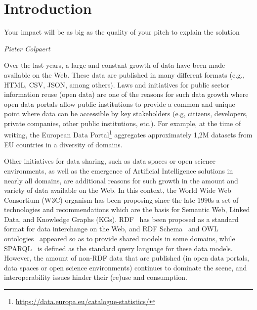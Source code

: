 \chapter{Introduction}
\label{chap:intro}

\epigraph{Your impact will be as big as the quality of your pitch to explain the solution}{\textit{Pieter Colpaert}}

Over the last years, a large and constant growth of data have been made available on the Web. These data are published in many different formats (e.g., HTML, CSV, JSON, among others). Laws and initiatives for public sector information reuse (open data) are one of the reasons for such data growth where open data portals allow public institutions to provide a common and unique point where data can be accessible by key stakeholders (e.g, citizens, developers, private companies, other public institutions, etc.). For example, at the time of writing, the European Data Portal\footnote{\url{https://data.europa.eu/catalogue-statistics/}} aggregates approximately 1,2M datasets from EU countries in a diversity of domains. 

Other initiatives for data sharing, such as data spaces or open science environments, as well as the emergence of Artificial Intelligence solutions in nearly all domains, are additional reasons for such growth in the amount and variety of data available on the Web. In this context, the World Wide Web Consortium (W3C) organism has been proposing since the late 1990s a set of technologies and recommendations which are the basis for Semantic Web, Linked Data, and Knowledge Graphs (KGs). RDF~\citep{brickley1999resource} has been proposed as a standard format for data interchange on the Web, and RDF Schema~\citep{brickley2014rdf} and OWL ontologies~\citep{mcguinness2004owl} appeared so as to provide shared models in some domains, while SPARQL~\citep{perez2009semantics} is defined as the standard query language for these data models. However, the amount of non-RDF data that are published (in open data portals, data spaces or open science environments) continues to dominate the scene, and interoperability issues hinder their (re)use and consumption. 

